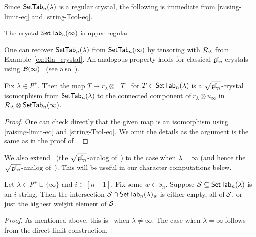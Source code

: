 \documentclass[11pt]{article}
\begin{document}
Since $\mathsf{SetTab}_n(\lambda)$ is a regular crystal, the following is immediate from \eqref{raising-limit-eq} and \eqref{string-Tcol-eq}.

\begin{corollary}
\label{cor:inf_upper_reg}
The crystal $\mathsf{SetTab}_n(\infty)$ is upper regular.
\end{corollary}

One can recover $\mathsf{SetTab}_n(\lambda)$ from $\mathsf{SetTab}_n(\infty)$ by tensoring with $\mathcal{R}_{\lambda}$ from Example~\ref{ex:Rla_crystal}.
An analogous property holds
 for classical $\mathfrak{gl}_n$-crystals using $\mathcal{B}(\infty)$~\cite[Thm.~5]{Kashiwara91} (see also~\cite{Joseph95}).

\begin{corollary}
\label{cor:finite_recovery}
Fix $\lambda \in P^+$.
Then the map   $T \mapsto r_{\lambda} \otimes [T]$ for $T \in \mathsf{SetTab}_n(\lambda)$ is a $\sqrt{\mathfrak{gl}_n}$-crystal isomorphism
from $\mathsf{SetTab}_n(\lambda)$ to 
the connected component of $r_{\lambda} \otimes u_{\infty}$
in $\mathcal{R}_{\lambda} \otimes \mathsf{SetTab}_n(\infty)$.
\end{corollary}

\begin{proof}
One can check directly that the given map is an isomorphism using \eqref{raising-limit-eq} and \eqref{string-Tcol-eq}.
We omit the details as the argument is the same as in the proof of~\cite[Cor.~5.3.13]{Joseph95}.
\end{proof}


We also extend~\cite[Lemma~4.19]{Yu23} (the $\sqrt{\mathfrak{gl}_n}$-analog of~\cite[Prop.~3.3.5]{Kashiwara93}) 
to the case when $\lambda = \infty$ (and hence the $\sqrt{\mathfrak{gl}_n}$-analog of~\cite[Prop.~3.3.4]{Kashiwara93}). 
This will be useful in our character computations below.

\begin{corollary}
\label{cor:string_decomp}
Let $\lambda \in P^+ \sqcup \{\infty\}$ and $i \in [n-1]$.
Fix some $w \in S_n$.
Suppose $\mathcal{S} \subseteq \mathsf{SetTab}_n(\lambda)$ is an $i$-string.
Then the intersection $\mathcal{S} \cap \mathsf{SetTab}_n(\lambda)_w$ is either empty, all of $\mathcal{S}$, or just the highest weight element of $\mathcal{S}$.
\end{corollary}

\begin{proof}
As mentioned above, this is~\cite[Lemma~4.19]{Yu23} when $\lambda \neq \infty$.
The case when $\lambda = \infty$ follows from the direct limit construction.
\end{proof}
\end{document}
